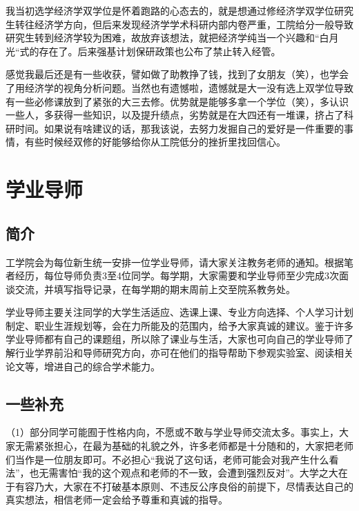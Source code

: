\documentclass[11pt,oneside]{book}
\begin{document}
我当初选学经济学双学位是怀着跑路的心态去的，就是想通过修经济学双学位研究生转往经济学方向，但后来发现经济学学术科研内部内卷严重，工院给分一般导致研究生转到经济学较为困难，故放弃该想法，就把经济学纯当一个兴趣和“白月光“式的存在了。后来强基计划保研政策也公布了禁止转入经管。

\vspace{10pt}

感觉我最后还是有一些收获，譬如做了助教挣了钱，找到了女朋友（笑），也学会了用经济学的视角分析问题。当然也有遗憾啦，遗憾就是大一没有选上双学位导致有一些必修课放到了紧张的大三去修。优势就是能够多拿一个学位（笑），多认识一些人，多获得一些知识，以及提升绩点，劣势就是在大四还有一堆课，挤占了科研时间。如果说有啥建议的话，那我该说，去努力发掘自己的爱好是一件重要的事情，有些时候经双修的好能够给你从工院低分的挫折里找回信心。

\section{学业导师}

\subsection{简介}

工学院会为每位新生统一安排一位学业导师，请大家关注教务老师的通知。根据笔者经历，每位导师负责3至4位同学。每学期，大家需要和学业导师至少完成3次面谈交流，并填写指导记录，在每学期的期末周前上交至院系教务处。

\vspace{10pt}

学业导师主要关注同学的大学生活适应、选课上课、专业方向选择、个人学习计划制定、职业生涯规划等，会在力所能及的范围内，给予大家真诚的建议。鉴于许多学业导师都有自己的课题组，所以除了课业与生活，大家也可向自己的学业导师了解行业学界前沿和导师研究方向，亦可在他们的指导帮助下参观实验室、阅读相关论文等，增进自己的综合学术能力。

\subsection{一些补充}

（1）部分同学可能囿于性格内向，不愿或不敢与学业导师交流太多。事实上，大家无需紧张担心，在最为基础的礼貌之外，许多老师都是十分随和的，大家把老师们当作是一位朋友即可。不必担心“我说了这句话，老师可能会对我产生什么看法”，也无需害怕“我的这个观点和老师的不一致，会遭到强烈反对”。大学之大在于有容乃大，大家在不打破基本原则、不违反公序良俗的前提下，尽情表达自己的真实想法，相信老师一定会给予尊重和真诚的指导。
\end{document}
